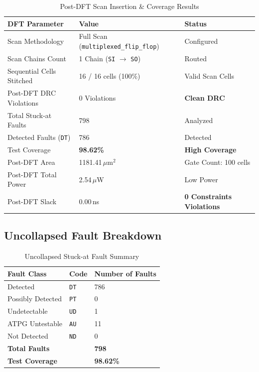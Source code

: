 \documentclass[12pt,a4paper]{article}
\begin{document}
\begin{table}[H]
\centering
\small
\begin{tabular}{lll}
\toprule
\textbf{DFT Parameter} & \textbf{Value} & \textbf{Status} \\
\midrule
Scan Methodology & Full Scan (\texttt{multiplexed\_flip\_flop}) & Configured \\
Scan Chains Count & 1 Chain (\texttt{SI} $\to$ \texttt{SO}) & Routed \\
Sequential Cells Stitched & 16 / 16 cells (100\%) & Valid Scan Cells \\
Post-DFT DRC Violations & 0 Violations & \textbf{Clean DRC} \\
Total Stuck-at Faults & 798 & Analyzed \\
Detected Faults (\texttt{DT}) & 786 & Detected \\
Test Coverage & \textbf{98.62\%} & \textbf{High Coverage} \\
Post-DFT Area & 1181.41\,$\mu$m$^2$ & Gate Count: 100 cells \\
Post-DFT Total Power & 2.54\,$\mu$W & Low Power \\
Post-DFT Slack & 0.00\,ns & \textbf{0 Constraints Violations} \\
\bottomrule
\end{tabular}
\caption{Post-DFT Scan Insertion \& Coverage Results}
\end{table}

\subsection{Uncollapsed Fault Breakdown}

\begin{table}[H]
\centering
\begin{tabular}{lll}
\toprule
\textbf{Fault Class} & \textbf{Code} & \textbf{Number of Faults} \\
\midrule
Detected & \texttt{DT} & 786 \\
Possibly Detected & \texttt{PT} & 0 \\
Undetectable & \texttt{UD} & 1 \\
ATPG Untestable & \texttt{AU} & 11 \\
Not Detected & \texttt{ND} & 0 \\
\midrule
\textbf{Total Faults} & & \textbf{798} \\
\textbf{Test Coverage} & & \textbf{98.62\%} \\
\bottomrule
\end{tabular}
\caption{Uncollapsed Stuck-at Fault Summary}
\end{table}
\end{document}
